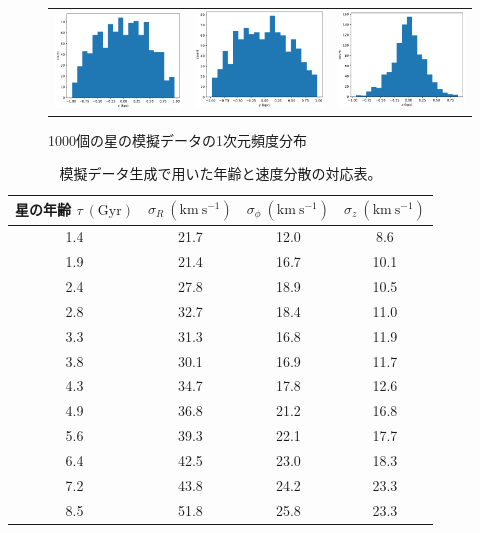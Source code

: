 \begin{figure}
   \centering
\begin{tabular}{ccc}
\includegraphics[width=4.5cm]{fig/dist_x.pdf}&
\includegraphics[width=4.5cm]{fig/dist_y.pdf}&
\includegraphics[width=4.5cm]{fig/dist_z.pdf}
\end{tabular}
    \caption{1000個の星の模擬データの1次元頻度分布}
    \label{distMockData}
\end{figure}

\begin{table}
\begin{center}
\begin{tabular}{c|c|c|c} \hline
 \rowcolor{LightCyan}
 星の年齢 $\tau\ \mathrm{(Gyr)}$ & $\sigma_R\ \mathrm{(km\ s^{-1})}$ & $\sigma_{\phi}\ \mathrm{(km\ s^{-1})}$ & $\sigma_{z}\ \mathrm{(km\ s^{-1})}$\\
 \hline
 1.4 & 21.7 & 12.0 & 8.6\\
 \hline
 1.9 & 21.4 & 16.7 & 10.1\\
 \hline
 2.4 & 27.8 & 18.9 & 10.5\\
 \hline
 2.8 & 32.7 & 18.4 & 11.0\\
 \hline
 3.3 & 31.3 & 16.8 & 11.9\\
 \hline
 3.8 & 30.1 & 16.9 & 11.7\\
 \hline
 4.3 & 34.7 & 17.8 & 12.6\\
 \hline
 4.9 & 36.8 & 21.2 & 16.8\\
 \hline
 5.6 & 39.3 & 22.1 & 17.7\\
 \hline
 6.4 & 42.5 & 23.0 & 18.3\\
 \hline
 7.2 & 43.8 & 24.2 & 23.3\\
 \hline
 8.5 & 51.8 & 25.8 & 23.3\\
 \hline
\end{tabular} \label{VelocityDispersion}
\vspace{3mm}
\caption{模擬データ生成で用いた年齢と速度分散の対応表\cite{YL18}。}
\end{center}
\end{table}

